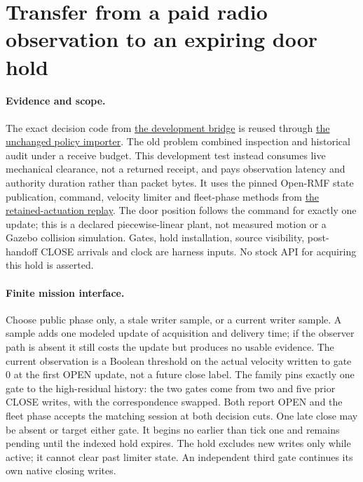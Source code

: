 \documentclass{article}
\begin{document}
\section*{Transfer from a paid radio observation to an expiring door hold}
\paragraph{Evidence and scope.}
The exact decision code from
\href{https://github.com/eternal-november/eos-research-programmes/pull/826}{the development bridge}
is reused through
\href{https://github.com/eternal-november/eos-research-programmes/pull/827}{the unchanged policy importer}.
The old problem combined inspection and historical audit under
a receive budget. This development test instead consumes live
mechanical clearance, not a returned receipt, and pays
observation latency and authority duration rather than packet bytes.
It uses the pinned Open-RMF state publication, command, velocity
limiter and fleet-phase methods from
\href{https://github.com/eternal-november/eos-research-programmes/pull/810}{the retained-actuation replay}.
The door position follows the command for exactly one update;
this is a declared piecewise-linear plant, not measured motion or
a Gazebo collision simulation. Gates, hold installation, source
visibility, post-handoff CLOSE arrivals and clock are harness
inputs. No stock API for acquiring this hold is asserted.

\paragraph{Finite mission interface.}
Choose public phase only, a stale writer sample, or a current
writer sample. A sample adds one modeled update of acquisition
and delivery time; if the observer path is absent it still costs
the update but produces no usable evidence. The current observation
is a Boolean threshold on the actual velocity written to gate 0
at the first OPEN update, not a future close label. The family
pins exactly one gate to the high-residual history: the two gates
come from two and five prior CLOSE writes, with the correspondence
swapped. Both report OPEN and the fleet phase accepts the matching
session at both decision cuts. One late close may be absent or
target either gate. It begins no earlier than tick one and remains
pending until the indexed hold expires. The hold excludes new
writes only while active; it cannot clear past limiter state.
An independent third gate continues its own native closing writes.
\end{document}

